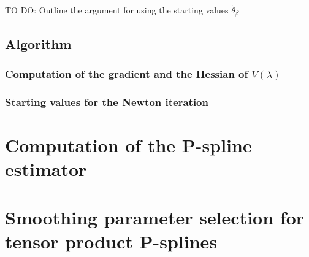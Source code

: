 \documentclass[12pt]{article}
\theoremstyle{definition}
\begin{document}
\bigskip
TO DO: Outline the argument for using the starting values $\breve{\theta}_\beta$
\bigskip

\subsection{Algorithm}

\subsubsection{Computation of the gradient and the Hessian of $V\left(\lambda\right)$}

\subsubsection{Starting values for the Newton iteration}


\section{Computation of the P-spline estimator}

\section{Smoothing parameter selection for tensor product P-splines}
\end{document}
